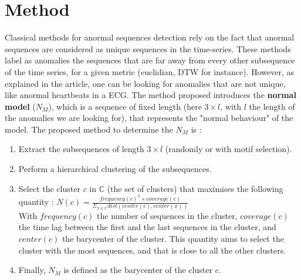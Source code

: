 \documentclass[11pt]{article}
\begin{document}

\section{Method}

Classical methods for anormal sequences detection rely on the fact that anormal sequences are considered as unique sequences in the time-series. 
These methods label as anomalies the sequences that are far away from every other subsequence of the time series, for a given metric (euclidian, DTW for instance). 
However, as explained in the article, one can be looking for anomalies that are not unique, like anormal heartbeats in a ECG.
The method proposed introduces the \textbf{normal model} ($N_M$), which is a sequence of fixed length (here $3 \times l $, with $l$ the length of the anomalies we are looking for), that represents the "normal behaviour" of the model. 
The proposed method to determine the $N_M$ is : 
\begin{enumerate}
    \item Extract the subsequences of length $3 \times l$  (randomly or with motif selection). 
    \item Perform a hierarchical clustering of the subsequences.
    \item Select the cluster $c$ in $\mathbb{C}$ (the set of clusters) that maximises the following quantity : $N(c) = \frac{frequency (c)^2 \times coverage (c) }{ \Sigma_{x \in \mathbb{C} } dist(center(c), center(x))}$\\
    With $frequency(c)$ the number of sequences in the cluster, $coverage(c)$ the time lag between the first and the last sequences in the cluster, and $center(c)$ the barycenter of the cluster.
    This quantity aims to select the cluster with the most sequences, and that is close to all the other clusters. 
    \item Finally, $N_M$ is defined as the barycenter of the cluster $c$.
\end{enumerate}
\end{document}
